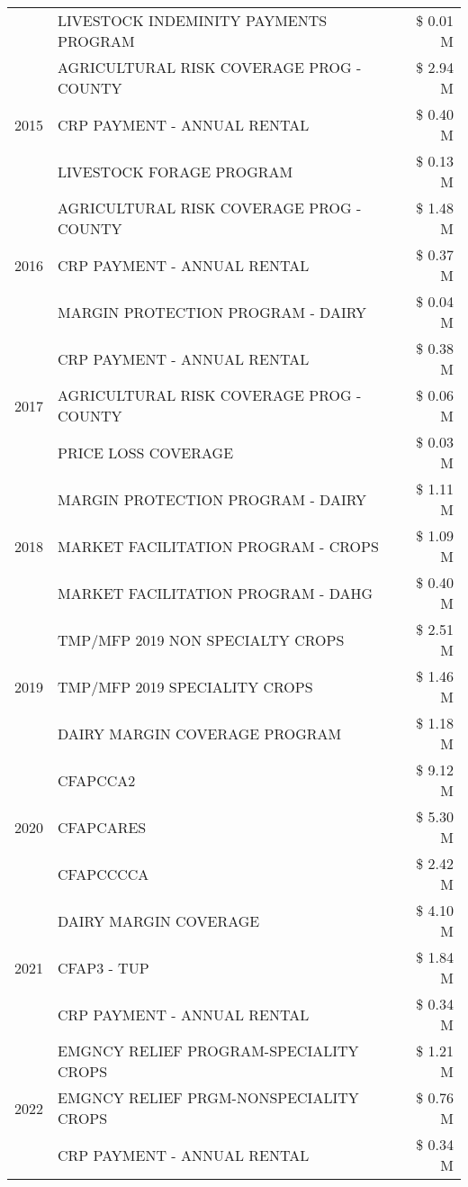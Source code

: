 \begin{tabular}{llr}
 & LIVESTOCK INDEMINITY PAYMENTS PROGRAM & \$ 0.01 M \\
\cline{1-3}
\multirow[t]{3}{*}{2015} & AGRICULTURAL RISK COVERAGE PROG - COUNTY & \$ 2.94 M \\
 & CRP PAYMENT - ANNUAL RENTAL & \$ 0.40 M \\
 & LIVESTOCK FORAGE PROGRAM & \$ 0.13 M \\
\cline{1-3}
\multirow[t]{3}{*}{2016} & AGRICULTURAL RISK COVERAGE PROG - COUNTY & \$ 1.48 M \\
 & CRP PAYMENT - ANNUAL RENTAL & \$ 0.37 M \\
 & MARGIN PROTECTION PROGRAM - DAIRY & \$ 0.04 M \\
\cline{1-3}
\multirow[t]{3}{*}{2017} & CRP PAYMENT - ANNUAL RENTAL & \$ 0.38 M \\
 & AGRICULTURAL RISK COVERAGE PROG - COUNTY & \$ 0.06 M \\
 & PRICE LOSS COVERAGE & \$ 0.03 M \\
\cline{1-3}
\multirow[t]{3}{*}{2018} & MARGIN PROTECTION PROGRAM - DAIRY & \$ 1.11 M \\
 & MARKET FACILITATION PROGRAM - CROPS & \$ 1.09 M \\
 & MARKET FACILITATION PROGRAM - DAHG & \$ 0.40 M \\
\cline{1-3}
\multirow[t]{3}{*}{2019} & TMP/MFP 2019 NON SPECIALTY CROPS & \$ 2.51 M \\
 & TMP/MFP 2019 SPECIALITY CROPS & \$ 1.46 M \\
 & DAIRY MARGIN COVERAGE PROGRAM & \$ 1.18 M \\
\cline{1-3}
\multirow[t]{3}{*}{2020} & CFAPCCA2 & \$ 9.12 M \\
 & CFAPCARES & \$ 5.30 M \\
 & CFAPCCCCA & \$ 2.42 M \\
\cline{1-3}
\multirow[t]{3}{*}{2021} & DAIRY MARGIN COVERAGE & \$ 4.10 M \\
 & CFAP3 - TUP & \$ 1.84 M \\
 & CRP PAYMENT - ANNUAL RENTAL & \$ 0.34 M \\
\cline{1-3}
\multirow[t]{3}{*}{2022} & EMGNCY RELIEF PROGRAM-SPECIALITY CROPS & \$ 1.21 M \\
 & EMGNCY RELIEF PRGM-NONSPECIALITY CROPS & \$ 0.76 M \\
 & CRP PAYMENT - ANNUAL RENTAL & \$ 0.34 M \\
\cline{1-3}
\bottomrule
\end{tabular}
